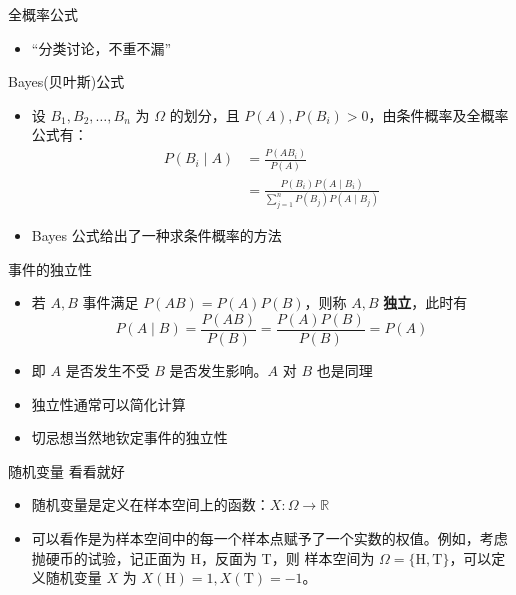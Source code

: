 \documentclass{beamer}
\begin{document}
    \begin{frame}{全概率公式}
        \begin{itemize}
            \setlength{\itemsep}{10pt}
            \item “分类讨论，不重不漏”
        \end{itemize}
    \end{frame}

    \begin{frame}{Bayes(贝叶斯)公式}
        \begin{itemize}
            \setlength{\itemsep}{10pt}
            \item 设 $B_1,B_2,\dots,B_n$ 为 $\Omega$ 的划分，且 $P(A),P(B_i)>0$，由条件概率及全概率公式有：
            \begin{align*}
                P(B_i \mid A) 
                &= \frac{P(AB_i)}{P(A)} \\
                &= \frac{P(B_i)P(A \mid B_i)}{\sum_{j=1}^{n}P(B_j)P(A \mid B_j)}
            \end{align*}
            \item Bayes 公式给出了一种求条件概率的方法
        \end{itemize}
    \end{frame}

    \begin{frame}{事件的独立性}
        \begin{itemize}
            \setlength{\itemsep}{10pt}
            \item 若 $A,B$ 事件满足 $P(AB)=P(A)P(B)$，则称 $A,B$ \textbf{独立}，此时有
            $$
                P(A\mid B) = \frac{P(AB)}{P(B)} = \frac{P(A)P(B)}{P(B)}=P(A)
            $$
            \item 即 $A$ 是否发生不受 $B$ 是否发生影响。$A$ 对 $B$ 也是同理
            \item 独立性通常可以简化计算
            \item 切忌想当然地钦定事件的独立性
        \end{itemize}
    \end{frame}

    \begin{frame}{随机变量}
        {看看就好}
        \begin{itemize}
            \setlength{\itemsep}{10pt}
            \item 随机变量是定义在样本空间上的函数：$X:\Omega \to \mathbb{R}$
            \item 可以看作是为样本空间中的每一个样本点赋予了一个实数的权值。例如，考虑抛硬币的试验，记正面为 H，反面为 T，则
            样本空间为 $\Omega=\{\text{H},\text{T}\}$，可以定义随机变量 $X$ 为 $X(\text{H})=1,X(\text{T})=-1$。
        \end{itemize}
    \end{frame}
\end{document}
